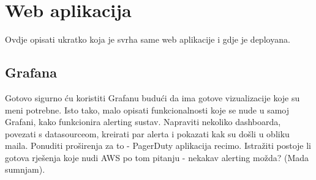 \chapter{Web aplikacija}

Ovdje opisati ukratko koja je svrha same web aplikacije i gdje je deployana. 

\section{Grafana}

Gotovo sigurno ću koristiti Grafanu budući da ima gotove vizualizacije koje su meni potrebne. Isto tako, malo opisati funkcionalnosti koje se nude u samoj Grafani, kako funkcionira alerting sustav. Napraviti nekoliko dashboarda, povezati s datasourceom, kreirati par alerta i pokazati kak su došli u obliku maila. Ponuditi proširenja za to - PagerDuty aplikacija recimo. Istražiti postoje li gotova rješenja koje nudi AWS po tom pitanju - nekakav alerting možda? (Mada sumnjam).